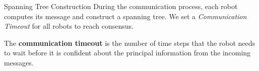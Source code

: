 \begin{frame}{Spanning Tree Construction}
\small{During the communication process, each robot computes its message and construct a spanning tree. We set a \emph{Communication Timeout} for all robots to reach consensus.}
  \begin{definition}
    The \textbf{communication timeout} is the number of time steps that the robot
    needs to wait before it is confident about the principal information from the
    incoming messages.
  \end{definition}
  
\end{frame}